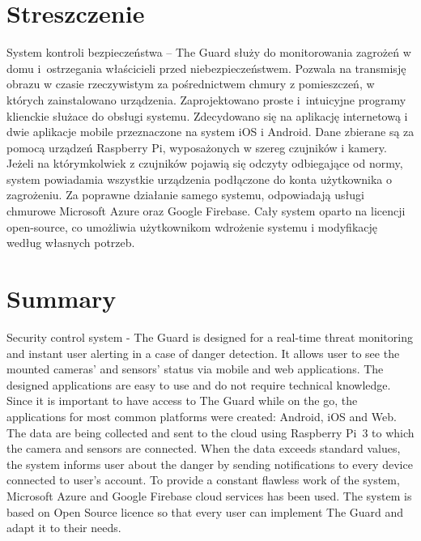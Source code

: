 \chapter*{Streszczenie}
System kontroli bezpieczeństwa – The Guard służy do monitorowania zagrożeń w domu i~ostrzegania właścicieli przed niebezpieczeństwem. Pozwala na transmisję obrazu w czasie rzeczywistym za pośrednictwem chmury z pomieszczeń, w których zainstalowano urządzenia.
Zaprojektowano proste i~intuicyjne programy klienckie służace do obsługi systemu.
Zdecydowano się na aplikację internetową i dwie aplikacje mobile przeznaczone na system iOS i Android.
Dane zbierane są za pomocą urządzeń Raspberry Pi, wyposażonych w szereg czujników i kamery.
Jeżeli na którymkolwiek z czujników pojawią się odczyty odbiegające od normy, system powiadamia wszystkie urządzenia podłączone do konta użytkownika o zagrożeniu.
Za poprawne działanie samego systemu, odpowiadają usługi chmurowe Microsoft Azure oraz Google Firebase.
Cały system oparto na licencji open-source, co umożliwia użytkownikom wdrożenie systemu i modyfikację według własnych potrzeb.

{\let\clearpage\relax\chapter*{Summary}}


Security control system - The Guard is designed for a real-time threat monitoring and instant user alerting in a case of danger detection.
It allows user to see the mounted cameras' and sensors' status via mobile and web applications.
The designed applications are easy to use and do not require technical knowledge.
Since it is important to have access to The Guard while on the go, the applications for most common platforms were created: Android, iOS and Web.
The data are being collected and sent to the cloud using Raspberry Pi~3 to which the camera and sensors are connected.
When the data exceeds standard values, the system informs user about the danger by sending notifications to every device connected to user's account.
To provide a constant flawless work of the system, Microsoft Azure and Google Firebase cloud services has been used.
The system is based on Open Source licence so that every user can implement The Guard and adapt it to their needs.

